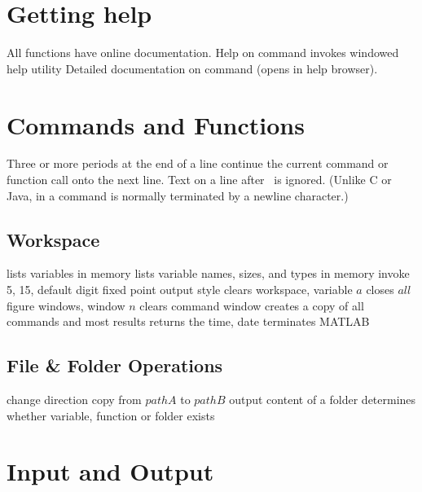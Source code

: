 
\def\content{\uppercase{MatLab}}
\def\shortcontent{\content}
\def\versionnumber{1.0}  %
\def\version{v\versionnumber\ \month\ \year}


\mytitle

\shortintro
\shortintroML

\section{Getting help}{All \ml functions have online documentation.}
	{Help on command}
	{invokes windowed help utility}
	{Detailed documentation on command (opens in help browser).}

\section{Commands and Functions}{Three or more periods at the end of a
line continue the current command or function call onto the next line. Text on
a line after \lldots\ is ignored. (Unlike C or Java, in \ml a command is normally
terminated by a newline character.)}

\subsection{Workspace}{}
	{lists variables in memory}
	{lists variable names, sizes, and types in memory}
	{invoke 5, 15, default digit fixed point output style}
	{clears workspace, variable $a$}
	{closes $all$ figure windows, window $n$}
	{clears command window}
	{creates a copy of all commands and most results}
	{returns the time, date}
	{terminates MATLAB}

\subsection{File \& Folder Operations}{}
	{change direction}
	{copy from $pathA$ to $pathB$}
	{output content of a folder}
	{determines whether variable, function or folder exists}

\section{Input and Output}{}
